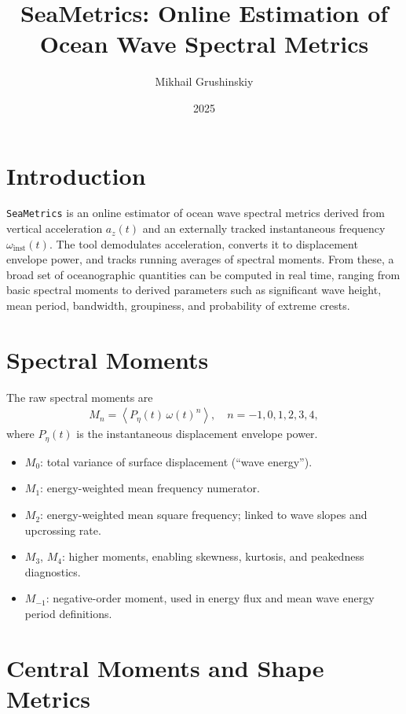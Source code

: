 \documentclass[11pt]{article}
\title{SeaMetrics: Online Estimation of Ocean Wave Spectral Metrics}
\author{Mikhail Grushinskiy}
\date{2025}
\begin{document}
\maketitle

\section{Introduction}

\texttt{SeaMetrics} is an online estimator of ocean wave spectral metrics
derived from vertical acceleration $a_z(t)$ and an externally tracked instantaneous frequency $\omega_{\text{inst}}(t)$.  
The tool demodulates acceleration, converts it to displacement envelope power, and tracks
running averages of spectral moments.  
From these, a broad set of oceanographic quantities can be computed in real time, ranging from
basic spectral moments to derived parameters such as significant wave height, mean period,
bandwidth, groupiness, and probability of extreme crests.

\section{Spectral Moments}

The raw spectral moments are
\begin{align}
M_n = \left\langle P_{\eta}(t)\,\omega(t)^n \right\rangle, \quad n = -1,0,1,2,3,4,
\end{align}
where $P_{\eta}(t)$ is the instantaneous displacement envelope power.  

\begin{itemize}
  \item $M_0$: total variance of surface displacement (``wave energy'').
  \item $M_1$: energy-weighted mean frequency numerator.
  \item $M_2$: energy-weighted mean square frequency; linked to wave slopes and upcrossing rate.
  \item $M_3$, $M_4$: higher moments, enabling skewness, kurtosis, and peakedness diagnostics.
  \item $M_{-1}$: negative-order moment, used in energy flux and mean wave energy period definitions.
\end{itemize}

\section{Central Moments and Shape Metrics}
\end{document}
